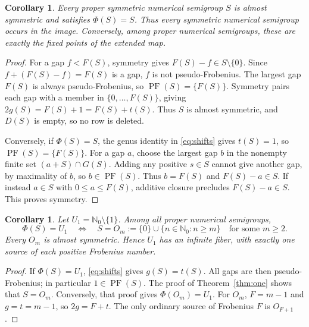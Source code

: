 \documentclass[11pt]{article}
\newtheorem{corollary}[theorem]{Corollary}
\newcommand{\N}{\mathbb{N}_0}
\newcommand{\PF}{\operatorname{PF}}
\begin{document}
\begin{corollary}\label{cor:fixed}
Every proper symmetric numerical semigroup $S$ is almost symmetric and
satisfies $\Phi(S)=S$. Thus every symmetric numerical semigroup occurs in
the image. Conversely, among proper numerical semigroups, these are exactly
the fixed points of the extended map.
\end{corollary}
\begin{proof}
For a gap $f<F(S)$, symmetry gives $F(S)-f\in S\setminus\{0\}$.
Since $f+(F(S)-f)=F(S)$ is a gap, $f$ is not pseudo-Frobenius.
The largest gap $F(S)$ is always pseudo-Frobenius, so
$\PF(S)=\{F(S)\}$. Symmetry pairs each gap with a member in
$\{0,\ldots,F(S)\}$, giving $2g(S)=F(S)+1=F(S)+t(S)$.
Thus $S$ is almost symmetric, and $D(S)$ is empty, so no row is deleted.

Conversely, if $\Phi(S)=S$, the genus identity in \eqref{eq:shifts} gives
$t(S)=1$, so $\PF(S)=\{F(S)\}$. For a gap $a$, choose the largest gap
$b$ in the nonempty finite set $(a+S)\cap G(S)$. Adding any positive
$s\in S$ cannot give another gap, by maximality of $b$, so $b\in\PF(S)$.
Thus $b=F(S)$ and $F(S)-a\in S$.
If instead $a\in S$ with $0\leq a\leq F(S)$, additive closure precludes
$F(S)-a\in S$. This proves symmetry.
\end{proof}

\begin{corollary}\label{cor:fiber}
Let $U_1=\N\setminus\{1\}$. Among all proper numerical semigroups,
\[
 \Phi(S)=U_1\quad\Longleftrightarrow\quad
 S=O_m:=\{0\}\cup\{n\in\N:n\geq m\}\quad\text{for some }m\geq2.
\]
Every $O_m$ is almost symmetric. Hence $U_1$ has an infinite fiber, with
exactly one source of each positive Frobenius number.
\end{corollary}
\begin{proof}
If $\Phi(S)=U_1$, \eqref{eq:shifts} gives $g(S)=t(S)$.
All gaps are then pseudo-Frobenius; in particular $1\in\PF(S)$.
The proof of Theorem~\ref{thm:one} shows that $S=O_m$.
Conversely, that proof gives $\Phi(O_m)=U_1$.
For $O_m$, $F=m-1$ and $g=t=m-1$, so $2g=F+t$.
The only ordinary source of Frobenius $F$ is $O_{F+1}$.
\end{proof}
\end{document}
